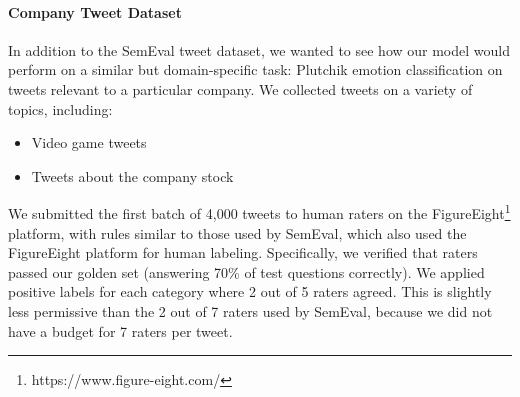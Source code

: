 \documentclass[letterpaper]{article} %
\begin{document}
\begin{table}[!t]
\centering
\caption{Label class balance (as percent) for SemEval and company tweet datasets.}
\label{table:class-imbalance}
\end{table}

\paragraph{Company Tweet Dataset}
In addition to the SemEval tweet dataset, we wanted to see how our model would perform on a similar but domain-specific task: Plutchik emotion classification on tweets relevant to a particular company. We collected tweets on a variety of topics, including:
\begin{itemize}
    \itemsep0em
    \item Video game tweets
    \item Tweets about the company stock
\end{itemize}



We submitted the first batch of 4,000 tweets to human raters on the FigureEight\footnote{https://www.figure-eight.com/} platform, with rules similar to those used by SemEval, which also used the FigureEight platform for human labeling. Specifically, we verified that raters passed our golden set (answering 70\% of test questions correctly). We applied positive labels for each category where 2 out of 5 raters agreed. This is slightly less permissive than the 2 out of 7 raters used by SemEval, because we did not have a budget for 7 raters per tweet.
\end{document}
